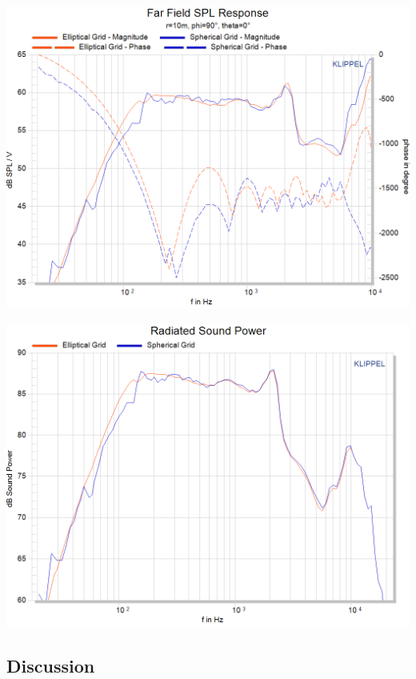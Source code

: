 \documentclass{report}
\begin{document}
\begin{minipage}{0.5\textwidth}
\begin{center}
	\includegraphics[width=.9\textwidth]{GridOpti/FF_Compa_El_Sph}
    \captionsetup{hypcap=false} 
	\label{fig:comp_ElSPh_SPL}
\end{center}
\end{minipage}
\begin{minipage}{0.5\textwidth}
\begin{center}
	\includegraphics[width=.9\textwidth]{GridOpti/SP_Compa_El_Sph}
    \captionsetup{hypcap=false} 
	\label{fig:comp_ElSPh_Pow}
\end{center}
\end{minipage}
\vspace{0.1cm}

\subsection{Discussion}
\end{document}
